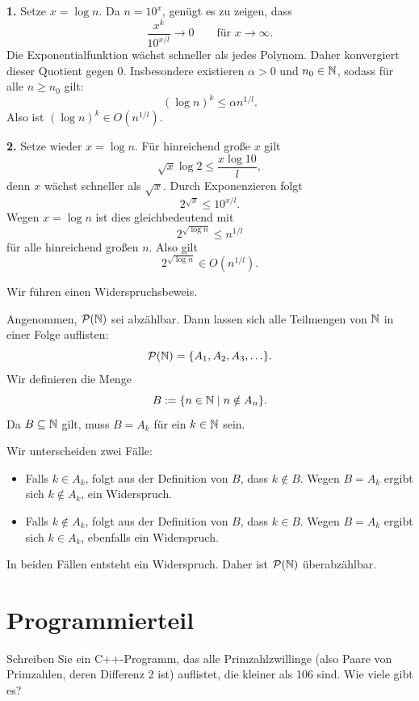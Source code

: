 \documentclass{report}
\begin{document}

\begin{myproof}
  \textbf{1.}
  Setze \(x=\log n\). Da \(n=10^x\), genügt es zu zeigen, dass
  \[
    \frac{x^k}{10^{x/l}}\longrightarrow 0
    \qquad\text{für }x\to\infty.
  \]
  Die Exponentialfunktion wächst schneller als jedes Polynom.
  Daher konvergiert dieser Quotient gegen \(0\). Insbesondere
  existieren \(\alpha>0\) und \(n_0\in\mathbb{N}\), sodass für alle
  \(n\ge n_0\) gilt:
  \[
    (\log n)^k\le \alpha n^{1/l}.
  \]
  Also ist \((\log n)^k\in O(n^{1/l})\).

  \medskip
  \textbf{2.}
  Setze wieder \(x=\log n\). Für hinreichend große \(x\) gilt
  \[
    \sqrt{x}\log 2\le \frac{x\log 10}{l},
  \]
  denn \(x\) wächst schneller als \(\sqrt{x}\). Durch
  Exponenzieren folgt
  \[
    2^{\sqrt{x}}\le 10^{x/l}.
  \]
  Wegen \(x=\log n\) ist dies gleichbedeutend mit
  \[
    2^{\sqrt{\log n}}\le n^{1/l}
  \]
  für alle hinreichend großen \(n\). Also gilt
  \[
    2^{\sqrt{\log n}}\in O(n^{1/l}).
  \]
\end{myproof}


\begin{myproof}
  Wir führen einen Widerspruchsbeweis.

  Angenommen, \(\mathcal P(\mathbb{N})\) sei abzählbar. Dann lassen
  sich alle Teilmengen von \(\mathbb{N}\) in einer Folge auflisten:
  \[
    \mathcal P(\mathbb{N})=\{A_1,A_2,A_3,\ldots\}.
  \]
  Wir definieren die Menge
  \[
    B:=\{n\in\mathbb{N}\mid n\notin A_n\}.
  \]
  Da \(B\subseteq\mathbb{N}\) gilt, muss \(B=A_k\) für ein
  \(k\in\mathbb{N}\) sein.

  Wir unterscheiden zwei Fälle:
  \begin{itemize}
    \item Falls \(k\in A_k\), folgt aus der Definition von \(B\),
      dass \(k\notin B\). Wegen \(B=A_k\) ergibt sich
      \(k\notin A_k\), ein Widerspruch.
    \item Falls \(k\notin A_k\), folgt aus der Definition von \(B\),
      dass \(k\in B\). Wegen \(B=A_k\) ergibt sich
      \(k\in A_k\), ebenfalls ein Widerspruch.
  \end{itemize}
  In beiden Fällen entsteht ein Widerspruch. Daher ist
  \(\mathcal P(\mathbb{N})\) überabzählbar.
\end{myproof}

\section{Programmierteil}
\qs{} {
Schreiben Sie ein C++-Programm, das alle Primzahlzwillinge (also Paare von Primzahlen, deren Differenz 2 ist) auflistet, die kleiner als 106 sind. Wie viele gibt es?
}

\end{document}
